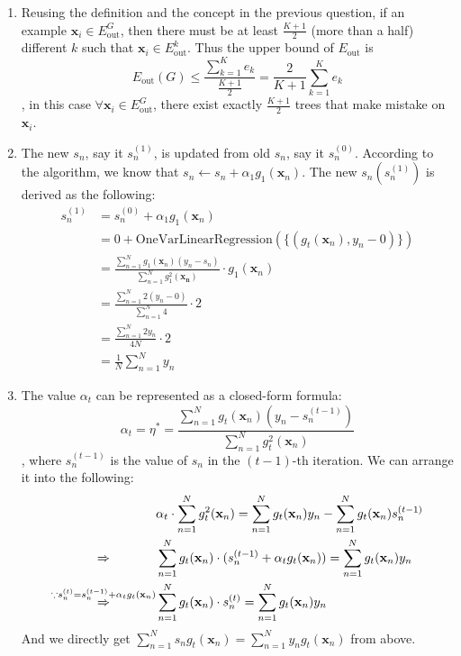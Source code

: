 \documentclass[11pt]{article}
\begin{document}
\begin{enumerate}[label=\textbf{\arabic*}.]
  \item Reusing the definition and the concept in the previous question, if an example $\mathbf{x}_i \in E_\text{out}^G$, then there must be at least $\frac{K+1}{2}$ (more than a half) different $k$ such that $\mathbf{x}_i \in E_\text{out}^k$. Thus the upper bound of $E_\text{out}$ is \[E_\text{out} (G) \leq \frac{\sum_{k=1}^K e_k}{\frac{K+1}{2}} = \frac{2}{K+1} \sum_{k=1}^K e_k\]
  , in this case $\forall \mathbf{x}_i \in E_\text{out}^G$, there exist exactly $\frac{K+1}{2}$ trees that make mistake on $\mathbf{x}_i$.

  \item The new $s_n$, say it $s_n^{(1)}$, is updated from old $s_n$, say it $s_n^{(0)}$. According to the algorithm, we know that $s_n \leftarrow s_n + \alpha_1 g_1(\mathbf{x}_n)$. The new $s_n (s_n^{(1)})$ is derived as the following:
  \[\begin{aligned} s_n^{(1)} &= s_n^{(0)} + \alpha_1 g_1(\mathbf{x}_n)\\
  &= 0 + \text{OneVarLinearRegression}(\{(g_t(\mathbf{x}_n), y_n - 0)\})\\
  &= \frac{\sum_{n=1}^N g_1(\mathbf{x}_n)(y_n-s_n)}{\sum_{n=1}^N g_1^2 (\mathbf{x_n})}\cdot g_1(\mathbf{x}_n)\\
  &= \frac{\sum_{n=1}^N 2(y_n-0)}{\sum_{n=1}^N 4}\cdot 2 \\
  &= \frac{\sum_{n=1}^N 2y_n}{4N}\cdot 2 \\ 
  &= \frac{1}{N}\sum_{n=1}^N y_n\end{aligned}\]

  \item The value $\alpha_t$ can be represented as a closed-form formula:
  \[\alpha_t = \eta^* = \frac{\sum_{n=1}^N g_t(\mathbf{x}_n)(y_n-s_n^{(t-1)})}{\sum_{n=1}^N g_t^2 (\mathbf{x}_n)}\], where $s_n^{(t-1)}$ is the value of $s_n$ in the $(t-1)$-th iteration. We can arrange it into the following:
  \[\begin{aligned}&\alpha_t \cdot \sum_{n=1}^N g_t^2 (\mathbf{x}_n) = \sum_{n=1}^N g_t(\mathbf{x}_n)y_n - \sum_{n=1}^N g_t(\mathbf{x}_n)s_n^{(t-1)} \\ 
  \overset{\text{\phantom{asasasasdasdasdasdaasd}}}{\Rightarrow} & \sum_{n=1}^N g_t(\mathbf{x}_n)\cdot (s_n^{(t-1)} + \alpha_t g_t(\mathbf{x}_n)) = \sum_{n=1}^N g_t(\mathbf{x}_n)y_n \\
  \overset{\because s_n^{(t)} = s_n^{(t-1)} + \alpha_t g_t(\mathbf{x}_n)}{\Rightarrow} & \sum_{n=1}^N g_t(\mathbf{x}_n)\cdot s_n^{(t)} = \sum_{n=1}^N g_t(\mathbf{x}_n)y_n\end{aligned}\]
  And we directly get $\sum_{n=1}^N s_n g_t (\mathbf{x}_n) = \sum_{n=1}^N y_n g_t(\mathbf{x}_n)$ from above.


\end{enumerate}
\end{document}

